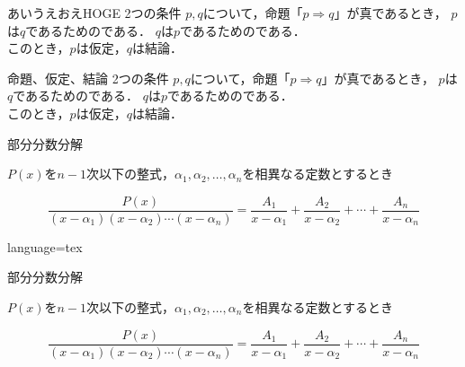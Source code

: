 \documentclass[../main]{subfiles}
\begin{document}
\begin{Note}[type=left,colback=cyan]{あいうえおえHOGE}
    2つの条件 $p,q$について，命題「$p \Rightarrow q$」が真であるとき，
    $p$は$q$であるためのである．
    $q$は$p$であるためのである． \\
    このとき，$p$は仮定，$q$は結論．
\end{Note}

\begin{Note}[type=invleft]{命題、仮定、結論}
    2つの条件 $p,q$について，命題「$p \Rightarrow q$」が真であるとき，
    $p$は$q$であるためのである．
    $q$は$p$であるためのである． \\
    このとき，$p$は仮定，$q$は結論．
\end{Note}

\HRuleLeader

\begin{Note}{部分分数分解}

$P(x)$を$n-1$次以下の整式，$\alpha_1,\alpha_2,\ldots,\alpha_n$を相異なる定数とするとき

\begin{equation}
    \frac{P(x)}{(x-\alpha_1)(x-\alpha_2)\cdots(x-\alpha_n)}
    = \frac{A_1}{x-\alpha_1} + \frac{A_2}{x-\alpha_2} + \cdots + \frac{A_n}{x-\alpha_n}
\end{equation}

\end{Note}
\begin{Code}{language=tex}
\begin{Note}{部分分数分解}

    $P(x)$を$n-1$次以下の整式，$\alpha_1,\alpha_2,\ldots,\alpha_n$を相異なる定数とするとき

    \begin{equation}
        \frac{P(x)}{(x-\alpha_1)(x-\alpha_2)\cdots(x-\alpha_n)}
        = \frac{A_1}{x-\alpha_1} + \frac{A_2}{x-\alpha_2} + \cdots + \frac{A_n}{x-\alpha_n}
    \end{equation}

\end{Note}
\end{Code}
\end{document}
